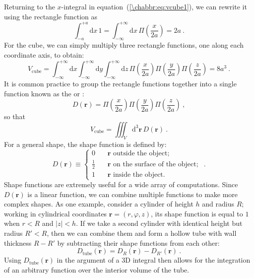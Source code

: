 \noindent Returning to the $x$-integral in equation~(\ref{\chabbr:eq:vcube1}), we can rewrite it using the rectangle function as
\[
	 \int_{-a}^{+a}\!\!\!\!\!\mathrm{d}{x}\, 1  =   \int_{-\infty}^{+\infty}\!\!\!\!\!\mathrm{d}{x}\, \Pi\left(\frac{x}{2a}\right) = 2a\ .
\]
For the cube, we can simply multiply three rectangle functions, one along each coordinate axis, to obtain:
\begin{equation}
	V_{\text{cube}} = \int_{-\infty}^{+\infty}\!\!\!\!\!\mathrm{d}x \int_{-\infty}^{+\infty}\!\!\!\!\!\mathrm{d}y \int_{-\infty}^{+\infty}\!\!\!\!\!\mathrm{d}z
	\, \Pi\left(\frac{x}{2a}\right)\Pi\left(\frac{y}{2a}\right)\Pi\left(\frac{z}{2a}\right) = 8a^3\ .
\end{equation}
It is common practice to group the rectangle functions together into a single function known as the  or :
\begin{equation}
	D(\mathbf{r}) = \Pi\left(\frac{x}{2a}\right)\Pi\left(\frac{y}{2a}\right)\Pi\left(\frac{z}{2a}\right)\ ,
\end{equation}
so that 
\[
	V_{\text{cube}} = \iiint_{V}\mathrm{d}^3\mathbf{r}\,D(\mathbf{r})\ .
\]
For a general shape, the shape function is defined by:
\begin{equation}
D(\mathbf{r}) \equiv \left\{\begin{array}{lcl}
0 & \, & \mathbf{r}\text{ outside the object};\\[3pt]
\frac{1}{2} && \mathbf{r}\text{ on the surface of the object};\\[3pt]
1 && \mathbf{r}\text{ inside the object}.
\end{array}\right.\ .\label{\chabbr:eq:shapefunction}
\end{equation}
Shape functions are extremely useful for a wide array of computations.  Since $D(\mathbf{r})$ is a linear function, we can combine multiple functions to make more complex shapes. As one example, consider a cylinder of height $h$ and radius $R$; working in cylindrical coordinates $\mathbf{r}=(r,\varphi,z)$, its shape function is equal to $1$ when $r<R$ and $\vert z\vert<h$. If we take a second cylinder with identical height but radius $R'<R$, then we can combine them and form a hollow tube with wall thickness $R-R'$ by subtracting their shape functions from each other:
\[
	D_{\text{tube}}(\mathbf{r}) = D_R(\mathbf{r}) - D_{R'}(\mathbf{r})\ .
\]
Using $D_{\text{tube}}(\mathbf{r})$ in the argument of a 3D integral then allows for the integration of an arbitrary function over the interior volume of the tube.


